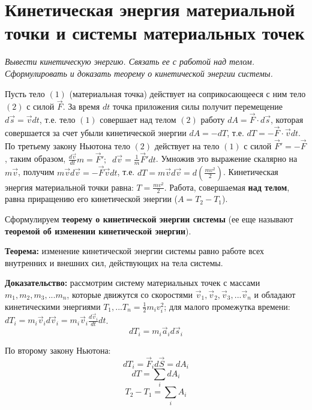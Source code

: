 \documentclass{article}
\begin{document}
  \section{Кинетическая энергия материальной точки и системы материальных точек}
    \par
      \textit{Вывести кинетическую энергию. Связать ее с работой над телом. Сформулировать и доказать теорему о кинетической энергии системы.}\\
    \par      
      Пусть тело $(1)$ (материальная точка) действует на соприкосающееся с ним тело $(2)$ с силой $\vec F$. За время $dt$ точка приложения силы получит перемещение $d\vec s=\vec vdt$, т.е. тело $(1)$ совершает над телом $(2)$ работу $dA=\vec F\cdot d\vec s$, которая совершается за счет убыли кинетической энергии $dA=-dT$, т.е. $dT=-\vec F\cdot \vec vdt$. По третьему закону Ньютона тело $(2)$ действует на тело $(1)$ с силой $\vec F'=-\vec F$, таким образом, $\frac{d\vec v}{dt}m=\vec F';\;\;d\vec v=\frac{1}{m}\vec F'dt$. Умножив это выражение скалярно на $m\vec v$, получим $m\vec vd\vec v=-\vec F\vec vdt$, т.е. $dT=m\vec vd\vec v=d(\frac{mv^2}{2})$. Кинетическая энергия материальной точки равна: $T=\frac{mv^2}{2}$. Работа, совершаемая \textbf{над телом}, равна приращению его кинетической энергии ($A=T_2-T_1$).
    \par
      Сформулируем \textbf{теорему о кинетической энергии системы} (ее еще называют \textbf{теоремой об изменении кинетической энергии}).
    \par
      \textbf{Теорема:} изменение кинетической энергии системы равно работе всех внутренних и внешних сил, действующих на тела системы.
    \par
      \textbf{Доказательство:} рассмотрим систему материальных точек с массами $m_1,m_2,m_3,...m_n$, которые движутся со скоростями $\vec v_1,\vec v_2,\vec v_3,...\vec v_n$ и обладают кинетическими энергиями $T_1,...T_n=\frac{1}{2}m_iv_i^2$; для малого промежутка времени: $dT_i=m_i\vec v_id\vec v_i=m_i\vec v_i\frac{d\vec v_i}{dt}dt$. 
      \begin{equation}
	dT_i=m_i\vec a_i d\vec s_i
      \end{equation}
    \par
      По второму закону Ньютона:
      \begin{equation}
	dT_i=\vec F_id\vec S=dA_i
      \end{equation}
      \begin{equation}
	dT=\sum_i{dA_i}
      \end{equation}  
      \begin{equation}
	T_2-T_1=\sum_i{A_i}
      \end{equation}
  \clearpage   
  
\end{document}
